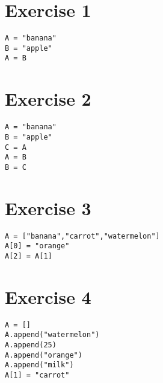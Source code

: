 \noindent
\begin{minipage}[t]{0.4\textwidth}
\section*{Exercise 1}
\vspace{0.3cm}
\begin{lstlisting}[style=bluecode]
A = "banana"
B = "apple"
A = B
\end{lstlisting}
\end{minipage}
\hfill
\begin{minipage}[t]{0.4\textwidth}
\section*{Exercise 2}
\vspace{0.3cm}
\begin{lstlisting}[style=bluecode]
A = "banana"
B = "apple"
C = A
A = B
B = C
\end{lstlisting}
\end{minipage}

\begin{minipage}[t]{1\textwidth}
\section*{Exercise 3}
\vspace{0.3cm}
\begin{lstlisting}[style=bluecode]
A = ["banana","carrot","watermelon"]
A[0] = "orange"
A[2] = A[1] 
\end{lstlisting}
\end{minipage}

\noindent
\begin{minipage}[t]{0.6\textwidth}
\section*{Exercise 4}
\vspace{0.3cm}
\begin{lstlisting}[style=bluecode]
A = []
A.append("watermelon")
A.append(25)
A.append("orange")
A.append("milk")
A[1] = "carrot"
\end{lstlisting}
\end{minipage}%

